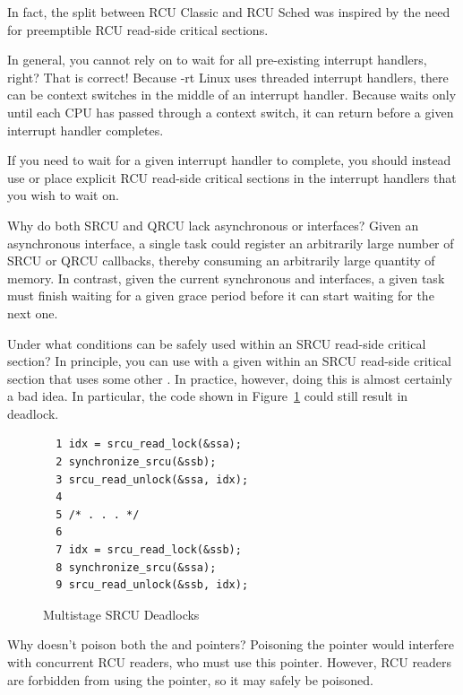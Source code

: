 \begin{enumerate}
	In fact, the split between RCU Classic and RCU Sched was inspired
	by the need for preemptible RCU read-side critical sections.

\QuickQ{}
	In general, you cannot rely on  to
	wait for all pre-existing interrupt handlers,
	right?
\QuickA{}
	That is correct!
	Because -rt Linux uses threaded interrupt handlers, there can
	be context switches in the middle of an interrupt handler.
	Because  waits only until each
	CPU has passed through a context switch, it can return
	before a given interrupt handler completes.

	If you need to wait for a given interrupt handler to complete,
	you should instead use  or place
	explicit RCU read-side critical sections in the interrupt
	handlers that you wish to wait on.

\QuickQ{}
	Why do both SRCU and QRCU lack asynchronous 
	or  interfaces?
\QuickA{}
	Given an asynchronous interface, a single task
	could register an arbitrarily large number of SRCU or QRCU callbacks,
	thereby consuming an arbitrarily large quantity of memory.
	In contrast, given the current synchronous
	 and 
	interfaces, a given task must finish waiting for a given grace period
	before it can start waiting for the next one.

\QuickQ{}
	Under what conditions can  be safely
	used within an SRCU read-side critical section?
\QuickA{}
	In principle, you can use
	 with a given 
	within an SRCU read-side critical section that uses some other
	.
	In practice, however, doing this is almost certainly a bad idea.
	In particular, the code shown in
	Figure~\ref{fig:defer:Multistage SRCU Deadlocks}
	could still result in deadlock.

\begin{figure}[htbp]
{ \centering
\begin{verbatim}
  1 idx = srcu_read_lock(&ssa);
  2 synchronize_srcu(&ssb);
  3 srcu_read_unlock(&ssa, idx);
  4
  5 /* . . . */
  6
  7 idx = srcu_read_lock(&ssb);
  8 synchronize_srcu(&ssa);
  9 srcu_read_unlock(&ssb, idx);
\end{verbatim}
}
\caption{Multistage SRCU Deadlocks}
\label{fig:defer:Multistage SRCU Deadlocks}
\end{figure}


\QuickQ{}
	Why doesn't  poison both the 
	and  pointers?
\QuickA{}
	Poisoning the  pointer would interfere
	with concurrent RCU readers, who must use this pointer.
	However, RCU readers are forbidden from using the 
	pointer, so it may safely be poisoned.


\end{enumerate}
